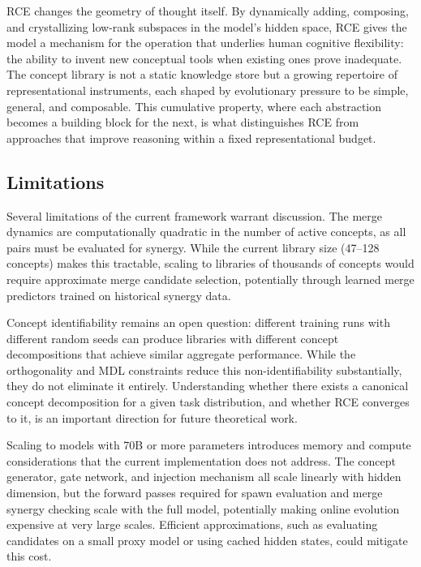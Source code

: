 \documentclass[11pt]{article}
\begin{document}
RCE changes the geometry of thought itself. By dynamically adding, composing, and crystallizing low-rank subspaces in the model's hidden space, RCE gives the model a mechanism for the operation that underlies human cognitive flexibility: the ability to invent new conceptual tools when existing ones prove inadequate. The concept library is not a static knowledge store but a growing repertoire of representational instruments, each shaped by evolutionary pressure to be simple, general, and composable. This cumulative property, where each abstraction becomes a building block for the next, is what distinguishes RCE from approaches that improve reasoning within a fixed representational budget.

\subsection{Limitations}

Several limitations of the current framework warrant discussion. The merge dynamics are computationally quadratic in the number of active concepts, as all pairs must be evaluated for synergy. While the current library size (47--128 concepts) makes this tractable, scaling to libraries of thousands of concepts would require approximate merge candidate selection, potentially through learned merge predictors trained on historical synergy data.

Concept identifiability remains an open question: different training runs with different random seeds can produce libraries with different concept decompositions that achieve similar aggregate performance. While the orthogonality and MDL constraints reduce this non-identifiability substantially, they do not eliminate it entirely. Understanding whether there exists a canonical concept decomposition for a given task distribution, and whether RCE converges to it, is an important direction for future theoretical work.

Scaling to models with 70B or more parameters introduces memory and compute considerations that the current implementation does not address. The concept generator, gate network, and injection mechanism all scale linearly with hidden dimension, but the forward passes required for spawn evaluation and merge synergy checking scale with the full model, potentially making online evolution expensive at very large scales. Efficient approximations, such as evaluating candidates on a small proxy model or using cached hidden states, could mitigate this cost.
\end{document}
